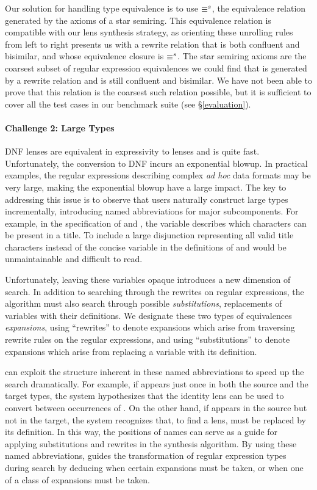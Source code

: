 \documentclass[acmsmall]{acmart}
\begin{document}
Our solution for handling type equivalence is to use $\equiv^s$, the equivalence relation
generated by the axioms of a star semiring.
This equivalence relation is compatible with our lens synthesis strategy, as
orienting these unrolling rules from left to right presents us with a rewrite
relation that is both confluent and bisimilar, and whose equivalence closure is
$\equiv^s$.
The star semiring axioms are the 
coarsest subset of regular expression equivalences we could
find that is generated by a rewrite relation and is still confluent and
bisimilar.  We have not been able to prove that this relation is the coarsest
such relation possible, but it is sufficient to cover all the test
cases in our benchmark suite (see \S\ref{evaluation}).

\paragraph*{Challenge 2: Large Types}
DNF lenses are equivalent in expressivity to lenses and \SynthDNFLens{} is quite
fast.
Unfortunately, the conversion to DNF incurs an exponential blowup.  In practical
examples, the regular expressions describing complex {\em ad hoc} data
formats may be very large, making the exponential blowup have a large
impact.  The key to addressing this issue is to observe that users
naturally construct large types incrementally, introducing named
abbreviations for major subcomponents.  For example, in the
specification of \LegacyTitle{} and
\ModernTitle{}, the variable \TextChar{} describes which characters
can be present in a title.
To include a large disjunction representing all valid title characters
instead of the concise variable \TextChar{} in the definitions of \LegacyTitle{}
and \ModernTitle{} would be unmaintainable and difficult to read.

Unfortunately, leaving these variables opaque introduces a new dimension of
search.  In addition to searching through the rewrites on regular expressions,
the algorithm must also search through possible \emph{substitutions},
replacements of variables with their definitions.
We designate these two types of equivalences \emph{expansions}, using
``rewrites'' to denote expansions which arise from traversing rewrite rules on
the regular expressions, and
using ``substitutions'' to denote expansions which arise from replacing a
variable with its definition.

\Optician{} can exploit the structure inherent in these named
abbreviations to speed up the search dramatically.  For example, if
\TextChar{} appears just once in both the source and the target types, the system
hypothesizes that the identity lens can be used to convert between
occurrences of \TextChar{}.  On the other hand, if \TextChar{} appears in the
source but not in the target, the system recognizes that, to find a lens,
\TextChar{} must be replaced by its
definition.  In this way, the positions of names
can serve as a guide for applying substitutions and rewrites in the
synthesis algorithm.  By using these named abbreviations, \TypeProp{} guides the 
transformation of regular expression types
during search by deducing when certain expansions must be taken, or when one of
a class of expansions must be taken.
\end{document}
